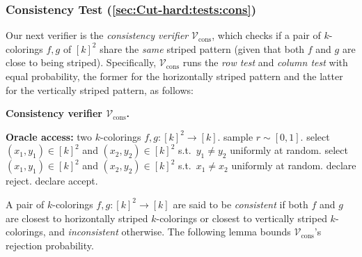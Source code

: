 \documentclass[11pt,fleqn]{article}
\renewcommand{\leq}{\leqslant}
\newcommand{\V}{\calV}
\newcommand{\Accept}{\textsf{accept}\xspace}
\newcommand{\Reject}{\textsf{reject}\xspace}
\newcommand{\f}{f}
\newcommand{\g}{g}
\newcommand{\Vcons}{\V_\mathrm{cons}}
\newcommand{\calV}{\mathcal{V}}
\theoremstyle{definition}
\numberwithin{equation}{section}
\begin{document}
\subsubsection{Consistency Test (\cref{sec:Cut-hard:tests:cons})}
Our next verifier is the \emph{consistency verifier} $\Vcons$, which checks
if a pair of $k$-colorings $\f,\g$ of $[k]^2$ share the \emph{same} striped pattern
(given that both $\f$ and $\g$ are close to being striped).
Specifically,
$\Vcons$ runs
the \emph{row test} and \emph{column test} with equal probability,
the former for the horizontally striped pattern and 
the latter for the vertically striped pattern,
as follows:


\begin{itembox}[l]{\textbf{Consistency verifier $\Vcons$.}}
\begin{algorithmic}[1]
    \item[\textbf{Oracle access:}]
        two $k$-colorings $\f, \g \colon [k]^2 \to [k]$.
    \State sample $r \sim [0,1]$.
    \If{$0 \leq r < \frac{1}{2}$} 
        \State select $(x_1,y_1) \in [k]^2$ and $(x_2,y_2) \in [k]^2$
            s.t.~$y_1 \neq y_2$ uniformly at random.
    \Else {}
        \State select $(x_1,y_1) \in [k]^2$ and $(x_2,y_2) \in [k]^2$
            s.t.~$x_1 \neq x_2$ uniformly at random.
    \EndIf
    \If{$\f(x_1,y_1) = \g(x_2,y_2)$}
        \State declare \Reject.
    \Else
        \State declare \Accept.
    \EndIf
\end{algorithmic}
\end{itembox}

\noindent
A pair of $k$-colorings $\f,\g \colon [k]^2 \to [k]$ are said to be
\emph{consistent} if 
both $\f$ and $\g$ are
closest to horizontally striped $k$-colorings or 
closest to vertically striped $k$-colorings, and
\emph{inconsistent} otherwise.
The following lemma bounds $\Vcons$'s rejection probability.
\end{document}
